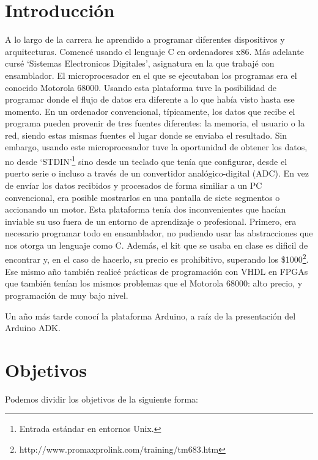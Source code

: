 

\section{Introducción}
A lo largo de la carrera he aprendido a programar diferentes dispositivos y arquitecturas. Comencé usando el lenguaje C en ordenadores x86. Más adelante cursé `Sistemas Electronicos Digitales', asignatura en la que trabajé con ensamblador. El microprocesador en el que se ejecutaban los programas era el conocido Motorola 68000. Usando esta plataforma tuve la posibilidad de programar donde el flujo de datos era diferente a lo que había visto hasta ese momento. En un ordenador convencional, típicamente, los datos que recibe el programa pueden provenir de tres fuentes diferentes: la memoria, el usuario o la red, siendo estas mismas fuentes el lugar donde se enviaba el resultado. Sin embargo, usando este microprocesador tuve la oportunidad de obtener los datos, no desde `STDIN'\footnote{Entrada estándar en entornos Unix.} sino desde un teclado que tenía que configurar, desde el puerto serie o incluso a través de un convertidor analógico-digital (ADC). En vez de envíar los datos recibidos y procesados de forma similiar a un PC convencional, era posible mostrarlos en una pantalla de siete segmentos o accionando un motor. Esta plataforma tenía dos inconvenientes que hacían inviable su uso fuera de un entorno de aprendizaje o profesional. Primero, era necesario programar todo en ensamblador, no pudiendo usar las abstracciones que nos otorga un lenguaje como C. Además, el kit que se usaba en clase es dificil de encontrar y, en el caso de hacerlo, su precio es prohibitivo, superando los \$1000\footnote{http://www.promaxprolink.com/training/tm683.htm}. Ese mismo año también realicé prácticas de programación con VHDL en FPGAs que también tenían los mismos problemas que el Motorola 68000: alto precio, y programación de muy bajo nivel.

Un año más tarde conocí la plataforma Arduino, a raíz de la presentación del Arduino ADK.
\section{Objetivos}
Podemos dividir los objetivos de la siguiente forma:

